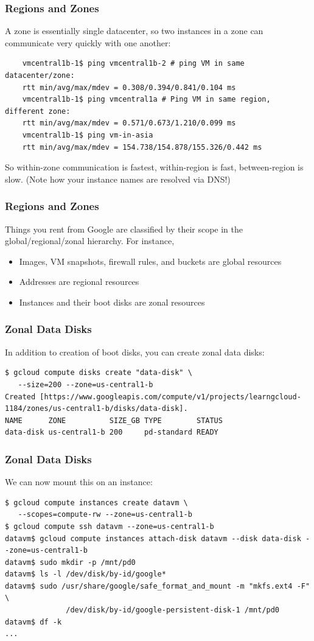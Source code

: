 \documentclass[9pt]{beamer}
\begin{document}
\begin{frame}[fragile]
  \frametitle{Regions and Zones}
  A zone is essentially single datacenter, so two instances in a zone can communicate very quickly with one another:
  \begin{verbatim}
    vmcentral1b-1$ ping vmcentral1b-2 # ping VM in same datacenter/zone:
    rtt min/avg/max/mdev = 0.308/0.394/0.841/0.104 ms
    vmcentral1b-1$ ping vmcentral1a # Ping VM in same region, different zone:
    rtt min/avg/max/mdev = 0.571/0.673/1.210/0.099 ms
    vmcentral1b-1$ ping vm-in-asia 
    rtt min/avg/max/mdev = 154.738/154.878/155.326/0.442 ms
  \end{verbatim}
  So within-zone communication is fastest, within-region is fast, between-region is slow. (Note how your instance names are resolved via DNS!)
\end{frame}

\begin{frame}[fragile]
\frametitle{Regions and Zones}
Things you rent from Google are classified by their scope in the global/regional/zonal hierarchy. For instance,
\begin{itemize}
	\item Images, VM snapshots, firewall rules, and buckets are global resources
	\item Addresses are regional resources
	\item Instances and their boot disks are zonal resources
\end{itemize}
\end{frame}

\begin{frame}[fragile]
\frametitle{Zonal Data Disks}
In addition to creation of boot disks, you can create zonal data disks:
\begin{verbatim}
$ gcloud compute disks create "data-disk" \
   --size=200 --zone=us-central1-b
Created [https://www.googleapis.com/compute/v1/projects/learngcloud-1184/zones/us-central1-b/disks/data-disk].
NAME      ZONE          SIZE_GB TYPE        STATUS
data-disk us-central1-b 200     pd-standard READY
\end{verbatim}
\end{frame}

\begin{frame}[fragile]
\frametitle{Zonal Data Disks}
We can now mount this on an instance:
\begin{verbatim}
$ gcloud compute instances create datavm \
   --scopes=compute-rw --zone=us-central1-b
$ gcloud compute ssh datavm --zone=us-central1-b
datavm$ gcloud compute instances attach-disk datavm --disk data-disk --zone=us-central1-b
datavm$ sudo mkdir -p /mnt/pd0
datavm$ ls -l /dev/disk/by-id/google*	
datavm$ sudo /usr/share/google/safe_format_and_mount -m "mkfs.ext4 -F" \
              /dev/disk/by-id/google-persistent-disk-1 /mnt/pd0
datavm$ df -k
...
\end{verbatim}
\end{frame}
\end{document}
